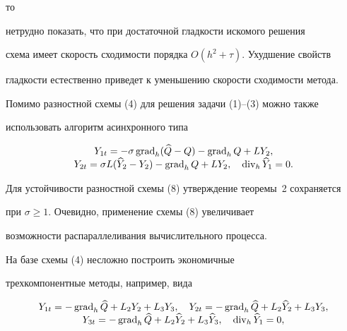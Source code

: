 то


нетрудно показать, что при достаточной гладкости искомого решения


схема имеет скорость сходимости порядка $O(h^2+\tau)$. Ухудшение свойств


гладкости естественно приведет к уменьшению скорости сходимости метода.





Помимо разностной схемы (4) для решения задачи (1)--(3) можно также


использовать алгоритм асинхронного типа


\begin{equation}


\begin{array}{c}


Y_{1t}=-\sigma\Grad_h(\widehat Q-Q)-\Grad_hQ+LY_2, \\


Y_{2t}=\sigma L(\widehat Y_2-Y_2)-\Grad_hQ+LY_2,\quad


\Div_h\widehat Y_1=0.


\end{array}


\end{equation}


Для устойчивости разностной схемы (8) утверждение теоремы~2 сохраняется


при $\sigma\geq 1$. Очевидно, применение схемы (8) увеличивает


возможности распараллеливания вычислительного процесса.





На базе схемы (4) несложно построить экономичные


трехкомпонентные методы, например, вида


\begin{equation}


\begin{array}{c}


Y_{1t}=-\Grad_h\widehat Q+L_2Y_2+L_3Y_3,\quad


Y_{2t}=-\Grad_h\widehat Q+L_2\widehat Y_2+L_3Y_3,\\


Y_{3t}=-\Grad_h\widehat Q+L_2\widehat Y_2+L_3\widehat Y_3,\quad


\Div_h\widehat Y_1=0,


\end{array}


\end{equation}


